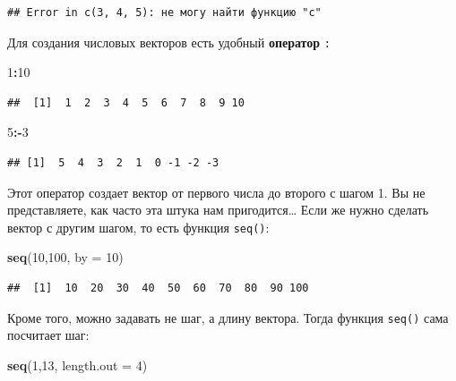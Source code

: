 \documentclass[]{book}
\newenvironment{Shaded}{\begin{snugshade}}{\end{snugshade}}
\newcommand{\KeywordTok}[1]{\textcolor[rgb]{0.13,0.29,0.53}{\textbf{#1}}}
\newcommand{\DataTypeTok}[1]{\textcolor[rgb]{0.13,0.29,0.53}{#1}}
\newcommand{\DecValTok}[1]{\textcolor[rgb]{0.00,0.00,0.81}{#1}}
\newcommand{\OperatorTok}[1]{\textcolor[rgb]{0.81,0.36,0.00}{\textbf{#1}}}
\newcommand{\NormalTok}[1]{#1}
\begin{document}
\begin{verbatim}
## Error in с(3, 4, 5): не могу найти функцию "с"
\end{verbatim}

Для создания числовых векторов есть удобный \textbf{оператор} \texttt{:}

\begin{Shaded}
\begin{Highlighting}[]
\DecValTok{1}\OperatorTok{:}\DecValTok{10}
\end{Highlighting}
\end{Shaded}

\begin{verbatim}
##  [1]  1  2  3  4  5  6  7  8  9 10
\end{verbatim}

\begin{Shaded}
\begin{Highlighting}[]
\DecValTok{5}\OperatorTok{:-}\DecValTok{3}
\end{Highlighting}
\end{Shaded}

\begin{verbatim}
## [1]  5  4  3  2  1  0 -1 -2 -3
\end{verbatim}

Этот оператор создает вектор от первого числа до второго с шагом 1. Вы
не представляете, как часто эта штука нам пригодится\ldots{} Если же
нужно сделать вектор с другим шагом, то есть функция \texttt{seq()}:

\begin{Shaded}
\begin{Highlighting}[]
\KeywordTok{seq}\NormalTok{(}\DecValTok{10}\NormalTok{,}\DecValTok{100}\NormalTok{, }\DataTypeTok{by =} \DecValTok{10}\NormalTok{)}
\end{Highlighting}
\end{Shaded}

\begin{verbatim}
##  [1]  10  20  30  40  50  60  70  80  90 100
\end{verbatim}

Кроме того, можно задавать не шаг, а длину вектора. Тогда функция
\texttt{seq()} сама посчитает шаг:

\begin{Shaded}
\begin{Highlighting}[]
\KeywordTok{seq}\NormalTok{(}\DecValTok{1}\NormalTok{,}\DecValTok{13}\NormalTok{, }\DataTypeTok{length.out =} \DecValTok{4}\NormalTok{)}
\end{Highlighting}
\end{Shaded}
\end{document}
